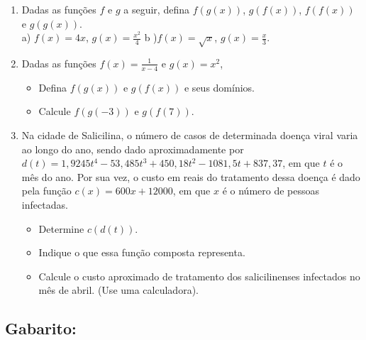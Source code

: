 \begin{enumerate}
\item Dadas as funções $f$ e $g$ a seguir, defina $f(g(x))$, $g(f(x))$, $f(f(x))$ e $g(g(x))$. \\
a) $f(x)=4x$, \hspace{0.1cm} $g(x)= \frac{x^2}{4}$ \hspace{1cm} b )$f(x)=\sqrt{x}$, \hspace{0.1cm} $g(x)= \frac{x}{3}$.

\item Dadas as funções $f(x)=\frac{1}{x-4}$ e $g(x)=x^2$,
\begin{itemize}
\item[a)]Defina $f(g(x))$ e $g(f(x))$ e seus domínios.
\item[b)] Calcule $f(g(-3))$ e $g(f(7))$.

\end{itemize}
\item Na cidade de Salicilina, o número de casos de determinada doença viral varia ao longo do ano, sendo dado aproximadamente por $d(t)=1,9245t^4-53,485t^3+450,18t^2-1081,5t+837,37$, em que $t$ é o mês do ano. Por sua vez, o custo em reais do tratamento dessa doença é dado pela função $c(x)=600x+12000$, em que $x$ é o número de pessoas infectadas.
\begin{itemize}
\item[a)] Determine $c(d(t))$.
\item[b)] Indique o que essa função composta representa.
\item[c)] Calcule o custo aproximado de tratamento dos salicilinenses infectados no mês de abril. (Use uma calculadora).
\end{itemize}
\end{enumerate}
\subsection{Gabarito:}

